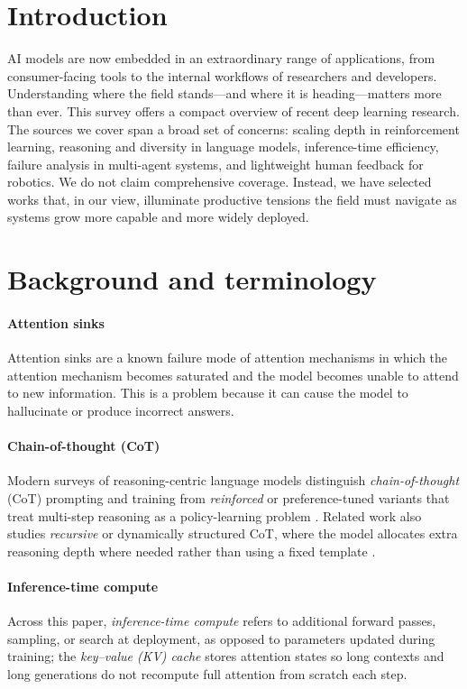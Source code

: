 \documentclass[conference]{IEEEtran}
\begin{document}
\section{Introduction}
AI models are now embedded in an extraordinary range of applications, from consumer-facing tools to the internal workflows of researchers and developers. Understanding where the field stands---and where it is heading---matters more than ever.
\newline
This survey offers a compact overview of recent deep learning research. The sources we cover span a broad set of concerns: scaling depth in reinforcement learning, reasoning and diversity in language models, inference-time efficiency, failure analysis in multi-agent systems, and lightweight human feedback for robotics. We do not claim comprehensive coverage. Instead, we have selected works that, in our view, illuminate productive tensions the field must navigate as systems grow more capable and more widely deployed.

\section{Background and terminology}

\paragraph{Attention sinks} Attention sinks are a known failure mode of attention mechanisms in which the attention mechanism becomes saturated and the model becomes unable to attend to new information. This is a problem because it can cause the model to hallucinate or produce incorrect answers.

\paragraph{Chain-of-thought (CoT)} Modern surveys of reasoning-centric language models distinguish \emph{chain-of-thought} (CoT) prompting and training from \emph{reinforced} or preference-tuned variants that treat multi-step reasoning as a policy-learning problem \cite{xu2025reasoning}. Related work also studies \emph{recursive} or dynamically structured CoT, where the model allocates extra reasoning depth where needed rather than using a fixed template \cite{sinha2025drcot}.

\paragraph{Inference-time compute} Across this paper, \emph{inference-time compute} refers to additional forward passes, sampling, or search at deployment, as opposed to parameters updated during training; the \emph{key--value (KV) cache} stores attention states so long contexts and long generations do not recompute full attention from scratch each step.
\end{document}

